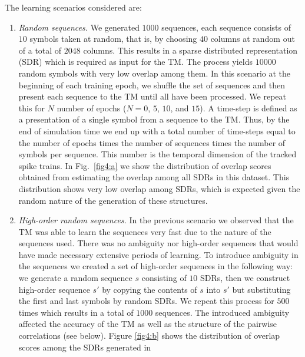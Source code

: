 \documentclass[11pt,letterpaper]{article}
\begin{document}
		The learning scenarios considered are:

        \begin{enumerate}
            \item\emph{Random sequences.} We generated $1000$ sequences, each sequence consists of $10$
            symbols taken at random, that is, by choosing $40$ columns at random out of a total of
            $2048$ columns. 
            This results in a sparse distributed representation (SDR) which is required as input for the TM.
            The process yields $10000$ random symbols with very low overlap among them.
            In this scenario at the beginning of each training epoch, we shuffle the set of sequences
            and then present each sequence to the TM until all have been processed.
            We repeat this for $N$ number of epochs ($N = 0$, $5$, 
            $10$, and $15$).
            A time-step is defined as a presentation of a single symbol from a sequence to the TM.
            Thus, by the end of simulation time we end up with a total number of time-steps equal to
            the number of epochs times the number of sequences times the number of symbols per sequence.
            This number is the temporal dimension of the tracked spike trains.
            In Fig.~\ref{fig4:a} we show the distribution of overlap scores obtained from estimating the
            overlap among all SDRs in this dataset.
            This distribution shows very low overlap among SDRs, which is expected given the random nature
            of the generation of these structures.
            \item\emph{High-order random sequences.} In the previous scenario we observed that the TM was able to 
            learn the sequences very fast due to the nature of the sequences used.
            There was no ambiguity nor high-order sequences that would have made necessary extensive
            periods of learning.
            To introduce ambiguity in the sequences we created a set of high-order sequences in the
            following way: we generate a random sequence $s$ consisting of $10$ SDRs, then we
            construct high-order sequence $s'$ by copying the contents of $s$ into $s'$ but substituting 
            the first and last symbols by random SDRs.
            We repeat this process for $500$ times which results in a total of 
            $1000$ sequences.
            The introduced ambiguity affected the accuracy of the TM as well as the structure of the
            pairwise correlations (see below).
            Figure \ref{fig4:b} shows the distribution of overlap scores among the SDRs generated in

\end{enumerate}
\end{document}
